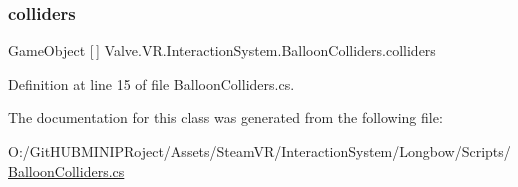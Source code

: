 \subsubsection{\texorpdfstring{colliders}{colliders}}
{\footnotesize\ttfamily Game\+Object \mbox{[}$\,$\mbox{]} Valve.\+V\+R.\+Interaction\+System.\+Balloon\+Colliders.\+colliders}



Definition at line 15 of file Balloon\+Colliders.\+cs.



The documentation for this class was generated from the following file\+:\begin{DoxyCompactItemize}
\item 
O\+:/\+Git\+H\+U\+B\+M\+I\+N\+I\+P\+Roject/\+Assets/\+Steam\+V\+R/\+Interaction\+System/\+Longbow/\+Scripts/\mbox{\hyperlink{_balloon_colliders_8cs}{Balloon\+Colliders.\+cs}}\end{DoxyCompactItemize}
